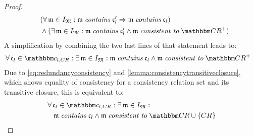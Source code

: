 \begin{proof}
\begin{align*}
        & \formulaskip
        (\forall \modeltuple{m} \in \metamodeltupleinstanceset{M} : \modeltuple{m} \containsmath \conditionelement{c}{l}' \Rightarrow \modeltuple{m} \containsmath \conditionelement{c}{l}) \\
        & \formulaskip
        \land (\exists \modeltuple{m} \in \metamodeltupleinstanceset{M} :
        \modeltuple{m} \containsmath \conditionelement{c}{l}' \land \modeltuple{m} \consistenttomath \transitiveclosure{\consistencyrelationset{CR}})
    \end{align*}
    A simplification by combining the two last lines of that statement leads to:
    \begin{align*}
        & \nonumber 
        \forall \conditionelement{c}{l} \in \condition{c}{l, \consistencyrelation{CR}{}} : \exists \modeltuple{m} \in \metamodeltupleinstanceset{M} : %
        \modeltuple{m} \containsmath \conditionelement{c}{l} \land \modeltuple{m} \consistenttomath \transitiveclosure{\consistencyrelationset{CR}}
    \end{align*}
    Due to \autoref{eq:redundancyconsistency} and \autoref{lemma:consistencytransitiveclosure}, which shows equality of consistency for a consistency relation set and its transitive closure, this is equivalent to:
    \begin{align} \label{eq:redundancycompatiblenew}
        & \nonumber 
        \forall \conditionelement{c}{l} \in \condition{c}{l, \consistencyrelation{CR}{}} : \exists \modeltuple{m} \in \metamodeltupleinstanceset{M} : \\
        & \formulaskip
        \modeltuple{m} \containsmath \conditionelement{c}{l} \land \modeltuple{m} \consistenttomath \consistencyrelationset{CR} \cup \setted{\consistencyrelation{CR}{}}
    \end{align}

\end{proof}

